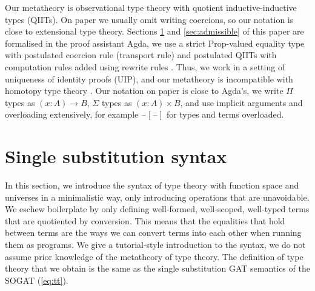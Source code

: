 \documentclass[sigplan,10pt,anonymous,review]{acmart}\settopmatter{printfolios=true,printccs=false,printacmref=false}
\newcommand{\ra}{\rightarrow}
\newcommand{\blank}{\mathord{\hspace{1pt}\text{--}\hspace{1pt}}} %
\begin{document}
Our metatheory is observational type theory
\cite{DBLP:phd/hal/Pujet22} with quotient inductive-inductive types
(QIITs). On paper we usually omit writing coercions, so our notation
is close to extensional type theory. Sections \ref{sec:tt} and
\ref{sec:admissible} of this paper are formalised in the proof
assistant Agda, we use a strict Prop-valued
\cite{DBLP:journals/pacmpl/GilbertCST19} equality type with postulated
coercion rule (transport rule) and postulated QIITs with computation
rules added using rewrite rules
\cite{DBLP:journals/pacmpl/CockxTW21}. Thus, we work in a setting of
uniqueness of identity proofs (UIP), and our metatheory is
incompatible with homotopy type theory \cite{HoTTbook}. Our notation
on paper is close to Agda's, we write $\Pi$ types as $(x:A)\ra B$,
$\Sigma$ types as $(x:A)\times B$, and use implicit arguments and
overloading extensively, for example $\blank[\blank]$ for types and
terms overloaded.

\section{Single substitution syntax}
\label{sec:tt}

In this section, we introduce the syntax of type theory with function
space and universes in a minimalistic way, only introducing operations
that are unavoidable. We eschew boilerplate by only defining
well-formed, well-scoped, well-typed terms that are quotiented by
conversion. This means that the equalities that hold between terms are
the ways we can convert terms into each other when running them as
programs. We give a tutorial-style introduction to the syntax, we do
not assume prior knowledge of the metatheory of type theory. The
definition of type theory that we obtain is the same as the single
substitution GAT semantics \cite{DBLP:conf/fscd/KaposiX24} of the
SOGAT (\ref{eq:tt}).
\end{document}
